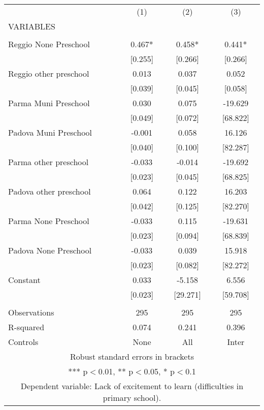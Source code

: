 \begin{tabular}{lccc} \hline
 & (1) & (2) & (3) \\
VARIABLES &  &  &  \\ \hline
 &  &  &  \\
Reggio None Preschool & 0.467* & 0.458* & 0.441* \\
 & [0.255] & [0.266] & [0.266] \\
Reggio other preschool & 0.013 & 0.037 & 0.052 \\
 & [0.039] & [0.045] & [0.058] \\
Parma Muni Preschool & 0.030 & 0.075 & -19.629 \\
 & [0.049] & [0.072] & [68.822] \\
Padova Muni Preschool & -0.001 & 0.058 & 16.126 \\
 & [0.040] & [0.100] & [82.287] \\
Parma other preschool & -0.033 & -0.014 & -19.692 \\
 & [0.023] & [0.045] & [68.825] \\
Padova other preschool & 0.064 & 0.122 & 16.203 \\
 & [0.042] & [0.125] & [82.270] \\
Parma None Preschool & -0.033 & 0.115 & -19.631 \\
 & [0.023] & [0.094] & [68.839] \\
Padova None Preschool & -0.033 & 0.039 & 15.918 \\
 & [0.023] & [0.082] & [82.272] \\
Constant & 0.033 & -5.158 & 6.556 \\
 & [0.023] & [29.271] & [59.708] \\
 &  &  &  \\
Observations & 295 & 295 & 295 \\
R-squared & 0.074 & 0.241 & 0.396 \\
 Controls & None & All & Inter \\ \hline
\multicolumn{4}{c}{ Robust standard errors in brackets} \\
\multicolumn{4}{c}{ *** p$<$0.01, ** p$<$0.05, * p$<$0.1} \\
\multicolumn{4}{c}{ Dependent variable: Lack of excitement to learn (difficulties in primary school).} \\
\end{tabular}
